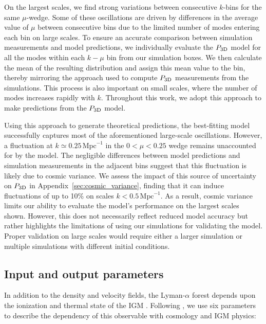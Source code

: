 \documentclass[longauth]{aa}
\newcommand{\lyaf}{Lyman-$\alpha$ forest\xspace}
\newcommand{\pthreed}{\ensuremath{P_{\rm 3D}}\xspace}
\newcommand{\iMpc}{\ensuremath{\,\mathrm{Mpc}^{-1}}}
\begin{document}
On the largest scales, we find strong variations between consecutive $k$-bins for the same $\mu$-wedge. Some of these oscillations are driven by differences in the average value of $\mu$ between consecutive bins due to the limited number of modes entering each bin on large scales. To ensure an accurate comparison between simulation measurements and model predictions, we individually evaluate the \pthreed model for all the modes within each $k-\mu$ bin from our simulation boxes. We then calculate the mean of the resulting distribution and assign this mean value to the bin, thereby mirroring the approach used to compute \pthreed measurements from the simulations. This process is also important on small scales, where the number of modes increases rapidly with $k$. Throughout this work, we adopt this approach to make predictions from the \pthreed model.

Using this approach to generate theoretical predictions, the best-fitting model successfully captures most of the aforementioned large-scale oscillations. However, a fluctuation at $k\simeq0.25\iMpc$ in the $0<\mu<0.25$ wedge remains unaccounted for by the model. The negligible differences between model predictions and simulation measurements in the adjacent bins suggest that this fluctuation is likely due to cosmic variance. We assess the impact of this source of uncertainty on \pthreed in Appendix~\ref{sec:cosmic_variance}, finding that it can induce fluctuations of up to 10\% on scales $k<0.5\iMpc$. As a result, cosmic variance limits our ability to evaluate the model's performance on the largest scales shown. However, this does not necessarily reflect reduced model accuracy but rather highlights the limitations of using our simulations for validating the model. Proper validation on large scales would require either a larger simulation or multiple simulations with different initial conditions.


\subsection{Input and output parameters}
\label{sec:strategy_params}

In addition to the density and velocity fields, the \lyaf depends upon the ionization and thermal state of the IGM \citep[e.g.,][]{mcdonald2003MeasurementCosmologicalGeometry}. Following \citet{Pedersen2021}, we use six parameters to describe the dependency of this observable with cosmology and IGM physics:
\end{document}
